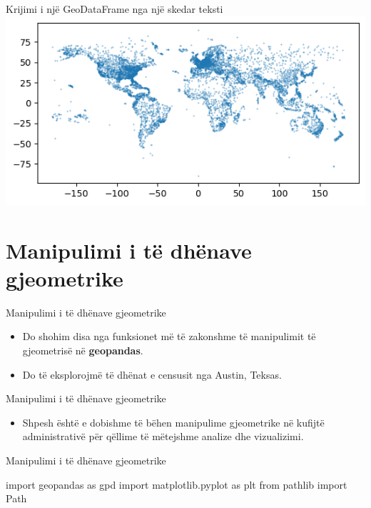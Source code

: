 \documentclass[
  ignorenonframetext,
]{beamer}
\newenvironment{Shaded}{\begin{snugshade}}{\end{snugshade}}
\newcommand{\ImportTok}[1]{#1}
\newcommand{\NormalTok}[1]{#1}
\providecommand{\tightlist}{%
  \setlength{\itemsep}{0pt}\setlength{\parskip}{0pt}}
\begin{document}
\begin{frame}{Krijimi i një GeoDataFrame nga një skedar teksti}
\protect\hypertarget{krijimi-i-njuxeb-geodataframe-nga-njuxeb-skedar-teksti-8}{}
\includegraphics{./Figs/airports.png}
\end{frame}

\hypertarget{manipulimi-i-tuxeb-dhuxebnave-gjeometrike}{%
\section{Manipulimi i të dhënave
gjeometrike}\label{manipulimi-i-tuxeb-dhuxebnave-gjeometrike}}

\begin{frame}{Manipulimi i të dhënave gjeometrike}
\protect\hypertarget{manipulimi-i-tuxeb-dhuxebnave-gjeometrike-1}{}
\begin{itemize}
\item
  Do shohim disa nga funksionet më të zakonshme të manipulimit të
  gjeometrisë në \textbf{geopandas}.
\item
  Do të eksplorojmë të dhënat e censusit nga Austin, Teksas.
\end{itemize}
\end{frame}

\begin{frame}{Manipulimi i të dhënave gjeometrike}
\protect\hypertarget{manipulimi-i-tuxeb-dhuxebnave-gjeometrike-2}{}
\begin{itemize}
\tightlist
\item
  Shpesh është e dobishme të bëhen manipulime gjeometrike në kufijtë
  administrativë për qëllime të mëtejshme analize dhe vizualizimi.
\end{itemize}
\end{frame}

\begin{frame}[fragile]{Manipulimi i të dhënave gjeometrike}
\protect\hypertarget{manipulimi-i-tuxeb-dhuxebnave-gjeometrike-3}{}

\begin{Shaded}
\begin{Highlighting}[]
\ImportTok{import}\NormalTok{ geopandas }\ImportTok{as}\NormalTok{ gpd}
\ImportTok{import}\NormalTok{ matplotlib.pyplot }\ImportTok{as}\NormalTok{ plt}
\ImportTok{from}\NormalTok{ pathlib }\ImportTok{import}\NormalTok{ Path}
\end{Highlighting}
\end{Shaded}
\end{frame}
\end{document}
